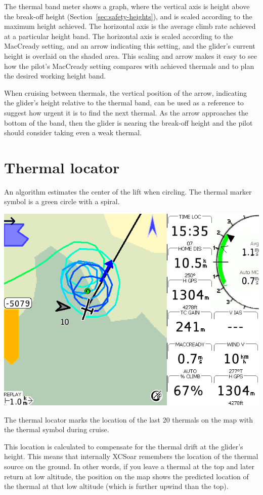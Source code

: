 \documentclass[a4paper,12pt]{refrep}
\begin{document}
The thermal band meter shows a graph, where the vertical axis is
height above the break-off height (Section~\ref{sec:safety-heights}), and is
scaled according to the maximum height achieved.  The horizontal axis is the average climb
rate achieved at a particular height band.  The horizontal axis is
scaled according to the MacCready setting, and an arrow indicating this
setting, and the glider's current height is overlaid on the shaded
area.  This scaling and arrow makes it easy to see how the pilot's
MacCready setting compares with achieved thermals and to plan the
desired working height band.

When cruising between thermals, the vertical position of the arrow,
indicating the glider's height relative to the thermal band, can be
used as a reference to suggest how urgent it is to find the next
thermal.  As the arrow approaches the bottom of the band, then the
glider is nearing the break-off height and the pilot should consider
taking even a weak thermal.

\section{Thermal locator}
An algorithm estimates the center of the lift when circling.  The
thermal marker symbol is a green circle with a spiral.

\begin{center}
\includegraphics[angle=0,width=0.8\linewidth,keepaspectratio='true']{figures/shot-tlocator-circling.png}
\end{center}

The thermal locator marks the location of the last 20 
thermals on the map with the thermal symbol during cruise.

This location is calculated to compensate for the thermal drift at 
the glider's height.  This means that internally XCSoar remembers 
the location of the thermal source on the ground.  In other words, 
if you leave a thermal at the top and later return at low altitude, 
the position on the map shows the predicted location of the thermal 
at that low altitude (which is further upwind than the top).  
\end{document}
